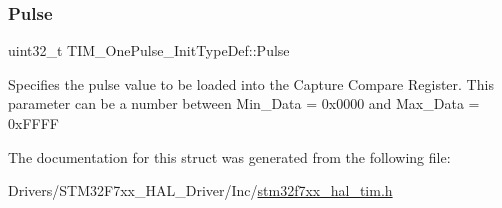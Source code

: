 \subsubsection{\texorpdfstring{Pulse}{Pulse}}
{\footnotesize\ttfamily uint32\+\_\+t T\+I\+M\+\_\+\+One\+Pulse\+\_\+\+Init\+Type\+Def\+::\+Pulse}

Specifies the pulse value to be loaded into the Capture Compare Register. This parameter can be a number between Min\+\_\+\+Data = 0x0000 and Max\+\_\+\+Data = 0x\+F\+F\+FF 

The documentation for this struct was generated from the following file\+:\begin{DoxyCompactItemize}
\item 
Drivers/\+S\+T\+M32\+F7xx\+\_\+\+H\+A\+L\+\_\+\+Driver/\+Inc/\mbox{\hyperlink{stm32f7xx__hal__tim_8h}{stm32f7xx\+\_\+hal\+\_\+tim.\+h}}\end{DoxyCompactItemize}
